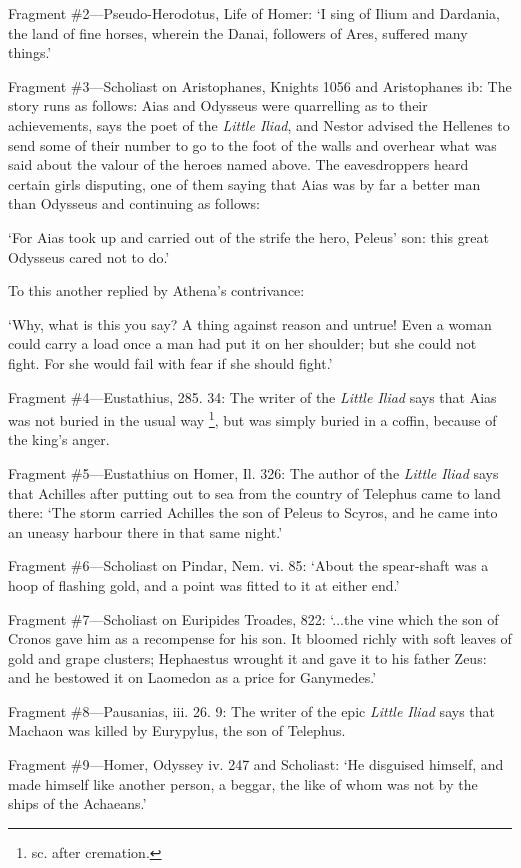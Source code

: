 Fragment \#2—Pseudo-Herodotus, Life of Homer: ‘I sing of Ilium and
Dardania, the land of fine horses, wherein the Danai, followers of Ares,
suffered many things.’

Fragment \#3—Scholiast on Aristophanes, Knights 1056 and Aristophanes ib:
The story runs as follows: Aias and Odysseus were quarrelling as to their
achievements, says the poet of the \emph{Little Iliad}, and Nestor
advised the Hellenes to send some of their number to go to the foot of the
walls and overhear what was said about the valour of the heroes named above.
The eavesdroppers heard certain girls disputing, one of them saying that Aias
was by far a better man than Odysseus and continuing as follows:

‘For Aias took up and carried out of the strife the hero, Peleus’
son: this great Odysseus cared not to do.’

To this another replied by Athena’s contrivance:

‘Why, what is this you say? A thing against reason and untrue! Even a
woman could carry a load once a man had put it on her shoulder; but she could
not fight. For she would fail with fear if she should fight.’

Fragment \#4—Eustathius, 285. 34: The writer of the \emph{Little
Iliad} says that Aias was not buried in the usual way \footnote{sc. after cremation.}, but was simply buried in a
coffin, because of the king’s anger.

Fragment \#5—Eustathius on Homer, Il. 326: The author of the \emph{Little
Iliad} says that Achilles after putting out to sea from the country of
Telephus came to land there: ‘The storm carried Achilles the son of
Peleus to Scyros, and he came into an uneasy harbour there in that same
night.’

Fragment \#6—Scholiast on Pindar, Nem. vi. 85: ‘About the
spear-shaft was a hoop of flashing gold, and a point was fitted to it at either
end.’

Fragment \#7—Scholiast on Euripides Troades, 822: ‘...the vine which
the son of Cronos gave him as a recompense for his son. It bloomed richly with
soft leaves of gold and grape clusters; Hephaestus wrought it and gave it to
his father Zeus: and he bestowed it on Laomedon as a price for
Ganymedes.’

Fragment \#8—Pausanias, iii. 26. 9: The writer of the epic \emph{Little
Iliad} says that Machaon was killed by Eurypylus, the son of Telephus.

Fragment \#9—Homer, Odyssey iv. 247 and Scholiast: ‘He disguised
himself, and made himself like another person, a beggar, the like of whom was
not by the ships of the Achaeans.’

